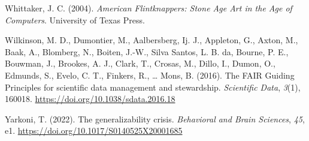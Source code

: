 \documentclass[
  11pt,
  letterpaper,
  DIV=11,
  numbers=noendperiod]{scrartcl}
\newlength{\cslhangindent}
\newenvironment{CSLReferences}[2] %
 {\begin{list}{}{%
  \setlength{\itemindent}{0pt}
  \setlength{\leftmargin}{0pt}
  \setlength{\parsep}{0pt}
  \ifodd #1
   \setlength{\leftmargin}{\cslhangindent}
   \setlength{\itemindent}{-1\cslhangindent}
  \fi
  \setlength{\itemsep}{#2\baselineskip}}}
 {\end{list}}
\begin{document}
\begin{CSLReferences}{1}{0}
Whittaker, J. C. (2004). \emph{American Flintknappers: Stone Age Art in
the Age of Computers}. University of Texas Press.

Wilkinson, M. D., Dumontier, M., Aalbersberg, Ij. J., Appleton, G.,
Axton, M., Baak, A., Blomberg, N., Boiten, J.-W., Silva Santos, L. B.
da, Bourne, P. E., Bouwman, J., Brookes, A. J., Clark, T., Crosas, M.,
Dillo, I., Dumon, O., Edmunds, S., Evelo, C. T., Finkers, R., \ldots{}
Mons, B. (2016). The FAIR Guiding Principles for scientific data
management and stewardship. \emph{Scientific Data}, \emph{3}(1), 160018.
\url{https://doi.org/10.1038/sdata.2016.18}

Yarkoni, T. (2022). The generalizability crisis. \emph{Behavioral and
Brain Sciences}, \emph{45}, e1.
\url{https://doi.org/10.1017/S0140525X20001685}

\end{CSLReferences}
\end{document}
